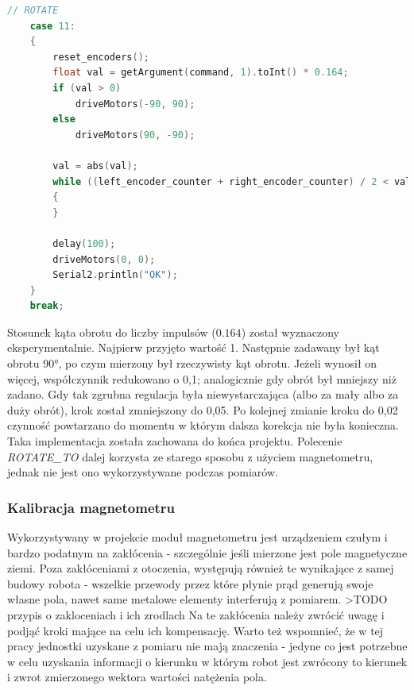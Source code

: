 \begin{lstlisting}[basicstyle=\footnotesize\ttfamily,language=c++,caption=Nowa implementacja obsługi polecenia \emph{ROTATE},label=lst:rotate]
// ROTATE
    case 11:
    {
        reset_encoders();
        float val = getArgument(command, 1).toInt() * 0.164;
        if (val > 0)
            driveMotors(-90, 90);
        else
            driveMotors(90, -90);

        val = abs(val);
        while ((left_encoder_counter + right_encoder_counter) / 2 < val)
        {
        }

        delay(100);
        driveMotors(0, 0);
        Serial2.println("OK");
    }
    break;
\end{lstlisting}

Stosunek kąta obrotu do liczby impulsów ($0.164$) został wyznaczony eksperymentalnie. Najpierw przyjęto wartość 1. Następnie zadawany był kąt obrotu 90°, po czym mierzony był rzeczywisty kąt obrotu. Jeżeli wynosił on więcej, współczynnik redukowano o 0,1; analogicznie gdy obrót był mniejszy niż zadano. Gdy tak zgrubna regulacja była niewystarczająca (albo za mały albo za duży obrót), krok został zmniejszony do 0,05. Po kolejnej zmianie kroku do 0,02 czynność powtarzano do momentu w którym dalsza korekcja nie była konieczna. \\

Taka implementacja została zachowana do końca projektu. Polecenie \emph{ROTATE\_TO} dalej korzysta ze starego sposobu z użyciem magnetometru, jednak nie jest ono wykorzystywane podczas pomiarów.

\subsubsection{Kalibracja magnetometru}

Wykorzystywany w projekcie moduł magnetometru jest urządzeniem czułym i bardzo podatnym na zakłócenia - szczególnie jeśli mierzone jest pole magnetyczne ziemi. Poza zakłóceniami z otoczenia, występują również te wynikające z samej budowy robota - wszelkie przewody przez które płynie prąd generują swoje własne pola, nawet same metalowe elementy interferują z pomiarem. >TODO przypis o zakloceniach i ich zrodlach Na te zakłócenia należy zwrócić uwagę i podjąć kroki mające na celu ich kompensację. Warto też wspomnieć, że w tej pracy jednostki uzyskane z pomiaru nie mają znaczenia - jedyne co jest potrzebne w celu uzyskania informacji o kierunku w którym robot jest zwrócony to kierunek i zwrot zmierzonego wektora wartości natężenia pola.

